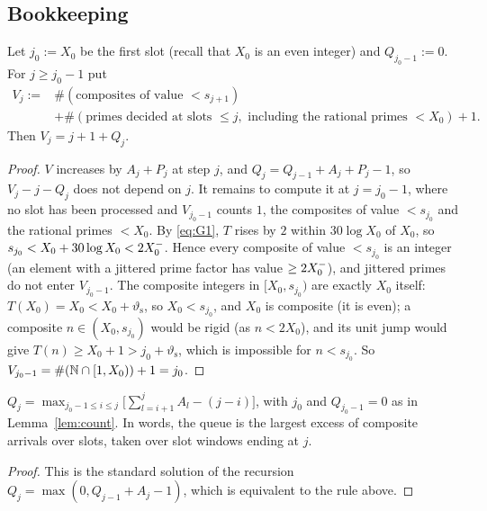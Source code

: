 \subsection{Bookkeeping}
\begin{lemma}\label{lem:count}
Let $j_0:=X_0$ be the first slot (recall that $X_0$ is an even integer) and $Q_{j_0-1}:=0$. For $j\ge j_0-1$ put
\[
\begin{aligned}
  V_j:={}&\#(\text{composites of value }<s_{j+1})\\
  &+\#(\text{primes decided at slots }\le j,\text{ including the rational primes }<X_0)+1.
\end{aligned}
\]
Then $V_j=j+1+Q_j$.
\end{lemma}
\begin{proof}
$V$ increases by $A_j+P_j$ at step $j$, and $Q_j=Q_{j-1}+A_j+P_j-1$, so $V_j-j-Q_j$ does not depend on $j$. It remains to
compute it at $j=j_0-1$, where no slot has been processed and $V_{j_0-1}$ counts $1$, the composites of value $<s_{j_0}$ and the
rational primes $<X_0$. By \eqref{eq:G1}, $T$ rises by $2$ within $30\log X_0$ of $X_0$, so $s_{j_0}<X_0+30\log X_0<2X_0^{-}$. Hence
every composite of value $<s_{j_0}$ is an integer (an element with a jittered prime factor has value $\ge2X_0^{-}$), and jittered
primes do not enter $V_{j_0-1}$. The composite integers in $[X_0,s_{j_0})$ are exactly $X_0$ itself: $T(X_0)=X_0<X_0+\vartheta_{\mathrm s}$,
so $X_0<s_{j_0}$, and $X_0$ is composite (it is even); a composite $n\in(X_0,s_{j_0})$ would be rigid (as $n<2X_0$), and its unit jump
would give $T(n)\ge X_0+1>j_0+\vartheta_{\mathrm s}$, which is impossible for $n<s_{j_0}$. So $V_{j_0-1}=\#(\mathbb{N}\cap[1,X_0))+1=j_0$.
\end{proof}

\begin{lemma}[Lindley]\label{lem:lindley}
$Q_j=\max_{j_0-1\le i\le j}\bigl[\sum_{l=i+1}^jA_l-(j-i)\bigr]$, with $j_0$ and $Q_{j_0-1}=0$ as in Lemma~\ref{lem:count}.
In words, the queue is the largest excess of composite arrivals over slots,
taken over slot windows ending at $j$.
\end{lemma}
\begin{proof}
This is the standard solution of the recursion $Q_j=\max(0,Q_{j-1}+A_j-1)$, which is equivalent to the rule above.
\end{proof}

